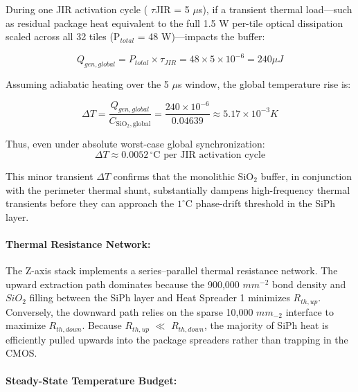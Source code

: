 \documentclass[journal]{IEEEtran}
\begin{document}
During one JIR activation cycle ( $\tau$JIR = 5 $\mu$s), if a transient thermal load---such as residual package heat equivalent to the full 1.5 W per-tile optical dissipation scaled across all 32 tiles (P$_{total}$ = 48 W)---impacts the buffer:

\begin{equation}
Q_{gen,global} = P_{total} \times \tau_{JIR} = 48 \times 5 \times 10^{-6} = 240 \mu J
\end{equation}

Assuming adiabatic heating over the 5 $\mu$s window, the global temperature rise is:

\begin{equation}
\Delta T = \frac {Q_{gen,global}}{C_{\text{SiO}_2, \text{global}}}
= \frac {240 \times 10^{-6}}{0.04639} \approx 5.17 \times 10^{-3} K
\end{equation}

Thus, even under absolute worst-case global synchronization:
\begin{equation}
\Delta T \approx 0.0052 \,^{\circ}\mathrm{C} \text{ per JIR activation cycle}
\end{equation}

This minor transient $\Delta T$ confirms that the monolithic $\mathrm{SiO_2}$ buffer, in conjunction with the perimeter thermal shunt, substantially dampens high-frequency thermal transients before they can approach the $1^\circ\mathrm{C}$ phase-drift threshold in the SiPh layer.

\paragraph{\textbf{Thermal Resistance Network:}}

The Z-axis stack implements a series--parallel thermal resistance network. The upward extraction path dominates because the 900,000 $mm^{-2}$ bond density and $SiO_2$ filling between the SiPh layer and Heat Spreader 1 minimizes $R_{th,up}$. Conversely, the downward path relies on the sparse 10,000 $mm_{-2}$ interface to maximize $R_{th,down}$. Because $R_{th,up}$ $\ll$ $R_{th,down}$, the majority of SiPh heat is efficiently pulled upwards into the package spreaders rather than trapping in the CMOS.

\paragraph{\textbf{Steady-State Temperature Budget:}}
\end{document}
